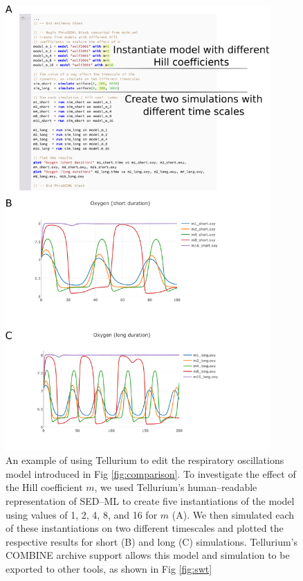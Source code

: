 \documentclass[10pt,letterpaper]{article}
\begin{document}
\begin{figure}
  \includegraphics[width=0.90\textwidth]{fig-hill2.pdf}
  \caption{An example of using Tellurium to edit the respiratory oscillations model introduced in Fig \ref{fig:comparison}. To investigate the effect of the Hill coefficient $m$, we used Tellurium's human--readable representation of SED--ML to create five instantiations of the model using values of 1, 2, 4, 8, and 16 for $m$ (A). We then simulated each of these instantiations on two different timescales and plotted the respective results for short (B) and long (C) simulations. Tellurium's COMBINE archive support allows this model and simulation to be exported to other tools, as shown in Fig \ref{fig:swt} }
  \label{fig:hill}
\end{figure}
\end{document}
